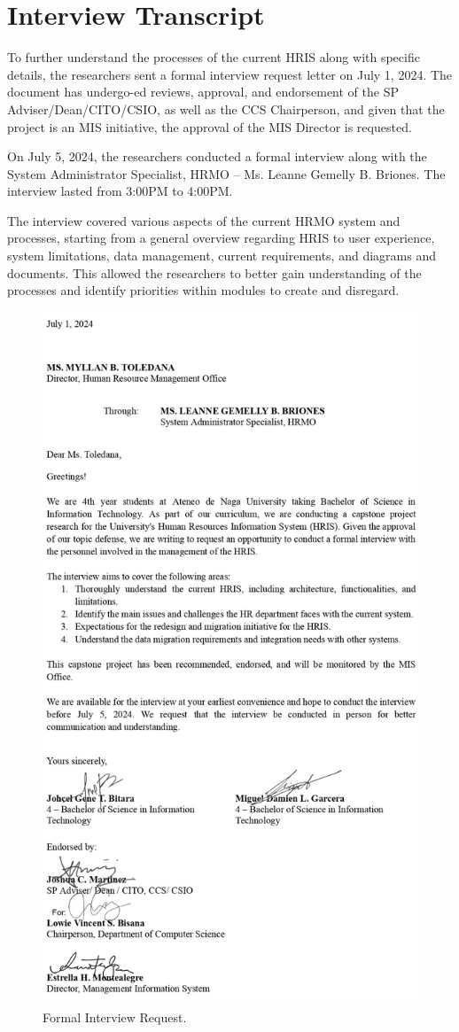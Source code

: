 \chapter{Interview Transcript}

To further understand the processes of the current HRIS along with specific details, the researchers sent a formal interview request letter on July 1, 2024. The document has undergo-ed reviews, approval, and endorsement of the SP Adviser/Dean/CITO/CSIO, as well as the CCS Chairperson, and given that the project is an MIS initiative, the approval of the MIS Director is requested.

On July 5, 2024, the researchers conducted a formal interview along with the System Administrator Specialist, HRMO -- Ms. Leanne Gemelly B. Briones. The interview lasted from 3:00PM to 4:00PM.

The interview covered various aspects of the current HRMO system and processes, starting from a general overview regarding HRIS to user experience, system limitations, data management, current requirements, and diagrams and documents. This allowed the researchers to better gain understanding of the processes and identify priorities within modules to create and disregard.

\begin{figure}[H]
    \centering
    \includegraphics[width=.78\linewidth]{figures/misc/interview-letter-request.jpg}
    \caption{Formal Interview Request.}
    \label{fig:interview-letter-request}
\end{figure}

